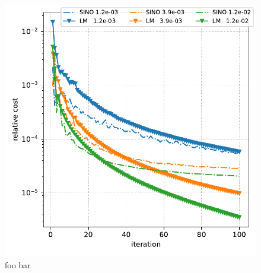 \documentclass{IEEEtran}
\begin{document}
\begin{figure}[t]
\centerline{\includegraphics[width=0.7\columnwidth]{./figs/brain2d_counts_1.0E+06_beta_2.0E-03_niter_5000_100_nsub_56_precond_False_metrics.pdf}}
\caption{foo bar}
\label{fig:cost}
\end{figure}
\end{document}
